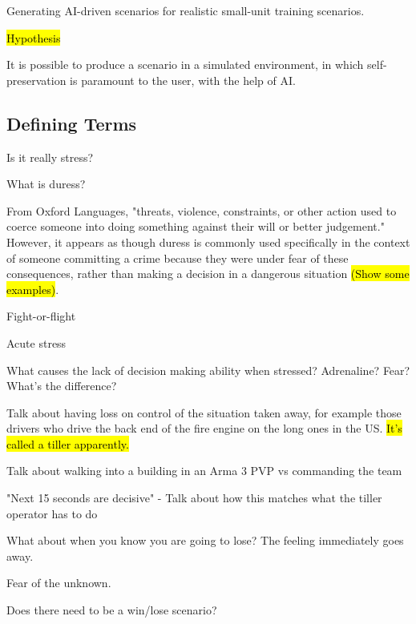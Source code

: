 \documentclass{article}
\begin{document}
  Generating AI-driven scenarios for realistic small-unit training scenarios. 
  
  \hl{Hypothesis}
  
  It is possible to produce a scenario in a simulated environment, in which self-preservation is paramount to the user, with the help of AI.
  
  
  \subsection{Defining Terms}
  

  Is it really stress?

  What is duress?

  From Oxford Languages, "threats, violence, constraints, or other action used to coerce someone into doing something against their will or better judgement." However, it appears as though duress is commonly used specifically in the context of someone committing a crime because they were under fear of these consequences, rather than making a decision in a dangerous situation \hl{(Show some examples)}.

  

  Fight-or-flight

  Acute stress

  What causes the lack of decision making ability when stressed? Adrenaline? Fear? What's the difference?


  Talk about having loss on control of the situation taken away, for example those drivers who drive the back end of the fire engine on the long ones in the US. \hl{It's called a tiller apparently.}

Talk about walking into a building in an Arma 3 PVP vs commanding the team

"Next 15 seconds are decisive" - Talk about how this matches what the tiller operator has to do

What about when you know you are going to lose? The feeling immediately goes away. 

Fear of the unknown.

Does there need to be a win/lose scenario? 
\end{document}
